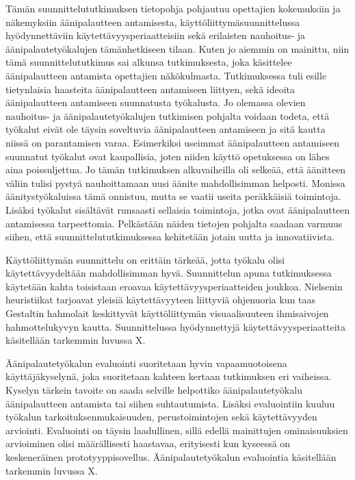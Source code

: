 \documentclass[utf8]{gradu3}
\begin{document}
Tämän suunnittelututkimuksen tietopohja pohjautuu opettajien kokemuksiin ja näkemyksiin äänipalautteen antamisesta, käyttöliittymäsuunnittelussa hyödynnettäviin käytettävyysperiaatteisiin sekä erilaisten nauhoitus- ja äänipalautetyökalujen tämänhetkiseen tilaan.  Kuten jo aiemmin on mainittu, niin tämä suunnittelututkimus sai alkunsa tutkimuksesta, joka käsittelee äänipalautteen antamista opettajien näkökulmasta. Tutkimuksessa tuli esille tietynlaisia haasteita äänipalautteen antamiseen liittyen, sekä ideoita äänipalautteen antamiseen suunnatusta työkalusta. Jo olemassa olevien nauhoitus- ja äänipalautetyökalujen tutkimisen pohjalta voidaan todeta, että työkalut eivät ole täysin soveltuvia äänipalautteen antamiseen ja sitä kautta niissä on parantamisen varaa. Esimerkiksi useimmat äänipalautteen antamiseen suunnatut työkalut ovat kaupallisia, joten niiden käyttö opetuksessa on lähes aina poissuljettua. Jo tämän tutkimuksen alkuvaiheilla oli selkeää, että äänitteen väliin tulisi pystyä nauhoittamaan uusi äänite mahdollisimman helposti. Monissa äänitystyökaluissa tämä onnistuu, mutta se vaatii useita peräkkäisiä toimintoja. Lisäksi työkalut sisältävät runsaasti sellaisia toimintoja, jotka ovat äänipalautteen antamisessa tarpeettomia. Pelkästään näiden tietojen pohjalta saadaan varmuus siihen, että suunnittelututkimuksessa kehitetään jotain uutta ja innovatiivista.

Käyttöliittymän suunnittelu on erittäin tärkeää, jotta työkalu olisi käytettävyydeltään mahdollisimman hyvä. Suunnittelun apuna tutkimuksessa käytetään kahta toisistaan eroavaa käytettävyysperiaatteiden joukkoa. Nielsenin heuristiikat tarjoavat yleisiä käytettävyyteen liittyviä ohjenuoria kun taas Gestaltin hahmolait keskittyvät käyttöliittymän visuaalisuuteen ihmisaivojen hahmottelukyvyn kautta. Suunnittelussa hyödynnettyjä käytettävyysperiaatteita käsitellään tarkemmin luvussa X.

Äänipalautetyökalun evaluointi suoritetaan hyvin vapaamuotoisena käyttäjäkyselynä, joka suoritetaan kahteen kertaan tutkimuksen eri vaiheissa. Kyselyn tärkein tavoite on saada selville helpottiko äänipalautetyökalu äänipalautteen antamista tai siihen suhtautumista. Lisäksi evaluointiin kuuluu työkalun tarkoituksenmukaisuuden, perustoimintojen sekä käytettävyyden arviointi. Evaluointi on täysin laadullinen, sillä edellä mainittujen ominaisuuksien arvioiminen olisi määrällisesti haastavaa, erityisesti kun kyseessä on keskeneräinen prototyyppisovellus. Äänipalautetyökalun evaluointia käsitellään tarkemmin luvussa X.
\end{document}
